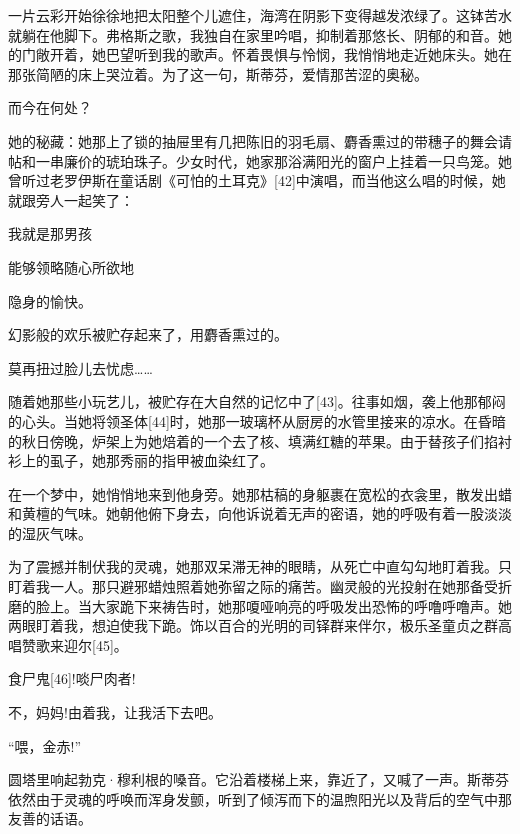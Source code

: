 \documentclass{article}
\begin{document}
一片云彩开始徐徐地把太阳整个儿遮住，海湾在阴影下变得越发浓绿了。这钵苦水就躺在他脚下。弗格斯之歌，我独自在家里吟唱，抑制着那悠长、阴郁的和音。她的门敞开着，她巴望听到我的歌声。怀着畏惧与怜悯，我悄悄地走近她床头。她在那张简陋的床上哭泣着。为了这一句，斯蒂芬，爱情那苦涩的奥秘。



而今在何处？



她的秘藏：她那上了锁的抽屉里有几把陈旧的羽毛扇、麝香熏过的带穗子的舞会请帖和一串廉价的琥珀珠子。少女时代，她家那浴满阳光的窗户上挂着一只鸟笼。她曾听过老罗伊斯在童话剧《可怕的土耳克》[42]中演唱，而当他这么唱的时候，她就跟旁人一起笑了：



我就是那男孩



能够领略随心所欲地



隐身的愉快。



幻影般的欢乐被贮存起来了，用麝香熏过的。



莫再扭过脸儿去忧虑……



随着她那些小玩艺儿，被贮存在大自然的记忆中了[43]。往事如烟，袭上他那郁闷的心头。当她将领圣体[44]时，她那一玻璃杯从厨房的水管里接来的凉水。在昏暗的秋日傍晚，炉架上为她焙着的一个去了核、填满红糖的苹果。由于替孩子们掐衬衫上的虱子，她那秀丽的指甲被血染红了。



在一个梦中，她悄悄地来到他身旁。她那枯稿的身躯裹在宽松的衣衾里，散发出蜡和黄檀的气味。她朝他俯下身去，向他诉说着无声的密语，她的呼吸有着一股淡淡的湿灰气味。



为了震撼并制伏我的灵魂，她那双呆滞无神的眼睛，从死亡中直勾勾地盯着我。只盯着我一人。那只避邪蜡烛照着她弥留之际的痛苦。幽灵般的光投射在她那备受折磨的脸上。当大家跪下来祷告时，她那嗄哑响亮的呼吸发出恐怖的呼噜呼噜声。她两眼盯着我，想迫使我下跪。饰以百合的光明的司铎群来伴尔，极乐圣童贞之群高唱赞歌来迎尔[45]。



食尸鬼[46]!啖尸肉者!



不，妈妈!由着我，让我活下去吧。



“喂，金赤!”



圆塔里响起勃克·穆利根的嗓音。它沿着楼梯上来，靠近了，又喊了一声。斯蒂芬依然由于灵魂的呼唤而浑身发颤，听到了倾泻而下的温煦阳光以及背后的空气中那友善的话语。
\end{document}
